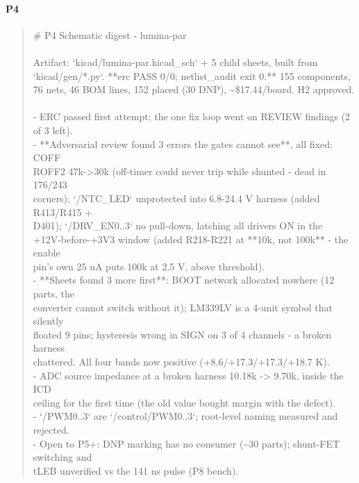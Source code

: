 \documentclass[11pt,a4paper]{article}
\begin{document}
\paragraph*{P4}
\begin{quote}\small\ttfamily\raggedright
\# P4 Schematic digest - lumina-par\\
~\\
Artifact: `kicad/lumina-par.kicad\_sch` + 5 child sheets, built from\\
`kicad/gen/{*}.py`. {*}{*}erc PASS 0/0; netlist\_audit exit 0.{*}{*} 155 components,\\
76 nets, 46 BOM lines, 152 placed (30 DNP), \textasciitilde{}\$17.44/board. H2 approved.\\
~\\
- ERC passed first attempt; the one fix loop went on REVIEW findings (2 of 3 left).\\
- {*}{*}Adversarial review found 3 errors the gates cannot see{*}{*}, all fixed: COFF\\
  ROFF2 47k-\textgreater{}30k (off-timer could never trip while shunted - dead in 176/243\\
  corners); `/NTC\_LED` unprotected into 6.8-24.4 V harness (added R413/R415 +\\
  D401); `/DRV\_EN0..3` no pull-down, latching all drivers ON in the\\
  +12V-before-+3V3 window (added R218-R221 at {*}{*}10k, not 100k{*}{*} - the enable\\
  pin's own 25 uA puts 100k at 2.5 V, above threshold).\\
- {*}{*}Sheets found 3 more first{*}{*}: BOOT network allocated nowhere (12 parts, the\\
  converter cannot switch without it); LM339LV is a 4-unit symbol that silently\\
  floated 9 pins; hysteresis wrong in SIGN on 3 of 4 channels - a broken harness\\
  chattered. All four bands now positive (+8.6/+17.3/+17.3/+18.7 K).\\
- ADC source impedance at a broken harness 10.18k -\textgreater{} 9.70k, inside the ICD\\
  ceiling for the first time (the old value bought margin with the defect).\\
- `/PWM0..3` are `/control/PWM0..3`; root-level naming measured and rejected.\\
- Open to P5+: DNP marking has no consumer (\textasciitilde{}30 parts); shunt-FET switching and\\
  tLEB unverified vs the 141 ns pulse (P8 bench).
\end{quote}
\end{document}
